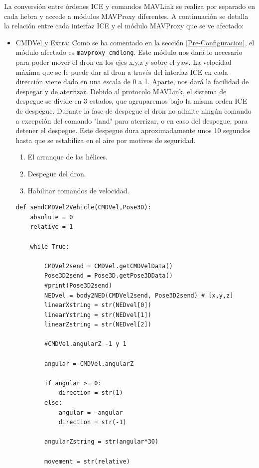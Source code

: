 La conversión entre órdenes ICE y comandos MAVLink se realiza por separado en cada hebra y accede a módulos MAVProxy diferentes. A continuación se detalla la relación entre cada interfaz ICE y el módulo MAVProxy que se ve afectado:

\begin{itemize}
  \item CMDVel y Extra: Como se ha comentado en la sección \ref{Pre-Configuracion}, el módulo afectado es \texttt{mavproxy\_cmdlong}. Este módulo nos dará lo necesario para poder mover el dron en los ejes x,y,z y sobre el yaw. La velocidad máxima que se le puede dar al dron a través del interfaz ICE en cada dirección viene dado en una escala de 0 a 1. Aparte, nos dará la facilidad de despegar y de aterrizar. Debido al protocolo MAVLink, el sistema de despegue se divide en 3 estados, que agruparemos bajo la misma orden ICE de despegue. Durante la fase de despegue el dron no admite ningún comando a excepción del comando "land" para aterrizar, o en caso del despegue, para detener el despegue.  Este despegue dura aproximadamente unos 10 segundos hasta que se estabiliza en el aire por motivos de seguridad.
  \begin{enumerate}
      \item El arranque de las hélices. 
      \item Despegue del dron.
      \item Habilitar comandos de velocidad.
  \end{enumerate}

\begin{lstlisting}[frame=single]
def sendCMDVel2Vehicle(CMDVel,Pose3D):
    absolute = 0
    relative = 1

    while True:

        CMDVel2send = CMDVel.getCMDVelData()
        Pose3D2send = Pose3D.getPose3DData()
        #print(Pose3D2send)
        NEDvel = body2NED(CMDVel2send, Pose3D2send) # [x,y,z]
        linearXstring = str(NEDvel[0])
        linearYstring = str(NEDvel[1])
        linearZstring = str(NEDvel[2])

        #CMDVel.angularZ -1 y 1

        angular = CMDVel.angularZ

        if angular >= 0:
            direction = str(1)
        else:
            angular = -angular
            direction = str(-1)

        angularZstring = str(angular*30)

        movement = str(relative)


\end{lstlisting}
\end{itemize}
